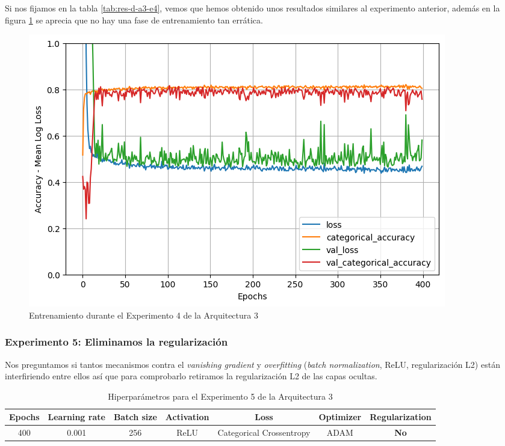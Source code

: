 \documentclass{article}
\begin{document}
			Si nos fijamos en la tabla \ref{tab:res-d-a3-e4}, vemos que hemos obtenido unos resultados similares al experimento anterior, adem\'as en la figura \ref{d-tr-a3-e4} se aprecia que no hay una fase de entrenamiento tan err\'atica.
			\begin{figure}[!h]
				\begin{center}
					\includegraphics[scale=0.5]{d-tr-a3-e4.png}		
					\caption{Entrenamiento durante el Experimento 4 de la Arquitectura 3}	
					\label{d-tr-a3-e4}
				\end{center}
			\end{figure}
			
		\subsubsection{Experimento 5: Eliminamos la regularizaci\'on}
		\label{d-s-a3-e5}
			Nos preguntamos si tantos mecanismos contra el \textit{vanishing gradient} y \textit{overfitting} (\textit{batch normalization}, ReLU, regularizaci\'on L2) est\'an interfiriendo entre ellos as\'i que para comprobarlo retiramos la regularizaci\'on L2 de las capas ocultas.
			\begin{table}[!h]
				\begin{tabular}{| c | c | c | c | c | c | c |}
					\textbf{Epochs} & \textbf{Learning rate} & \textbf{Batch size} & \textbf{Activation} & \textbf{Loss} & \textbf{Optimizer} & \textbf{Regularization} \\ \hline
					400 & 0.001 & 256 & ReLU & Categorical Crossentropy & ADAM & \textbf{No}
				\end{tabular}
				\caption{Hiperpar\'ametros para el Experimento 5 de la Arquitectura 3}
				\label{tab:hip-d-a3-e5}
			\end{table}
			
\end{document}
